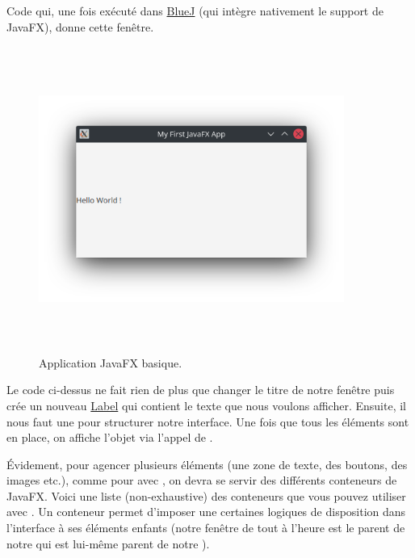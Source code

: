 \begin{appendix}
Code qui, une fois exécuté dans \href{https://www.bluej.org/}{BlueJ} (qui intègre nativement le support de JavaFX), donne cette fenêtre.

\begin{figure}[ht]
  \centering
  \includegraphics[width=10cm,height=10cm,keepaspectratio]{./media/first_javafx_app.png}
  \caption{Application JavaFX basique.}
\end{figure}

Le code ci-dessus ne fait rien de plus que changer le titre de notre fenêtre puis crée un nouveau \href{https://openjfx.io/javadoc/11/javafx.controls/javafx/scene/control/Label.html}{Label} qui contient le texte que nous voulons afficher. Ensuite, il nous faut une  pour structurer notre interface. Une fois que tous les éléments sont en place, on affiche l'objet  via l'appel de .

Évidement, pour agencer plusieurs éléments (une zone de texte, des boutons, des images etc.), comme pour avec , on devra se servir des différents conteneurs de JavaFX. Voici une liste (non-exhaustive) des conteneurs que vous pouvez utiliser avec . Un conteneur permet d'imposer une certaines logiques de disposition dans l'interface à ses éléments enfants (notre fenêtre de tout à l'heure est le parent de notre  qui est lui-même parent de notre ).


\end{appendix}
